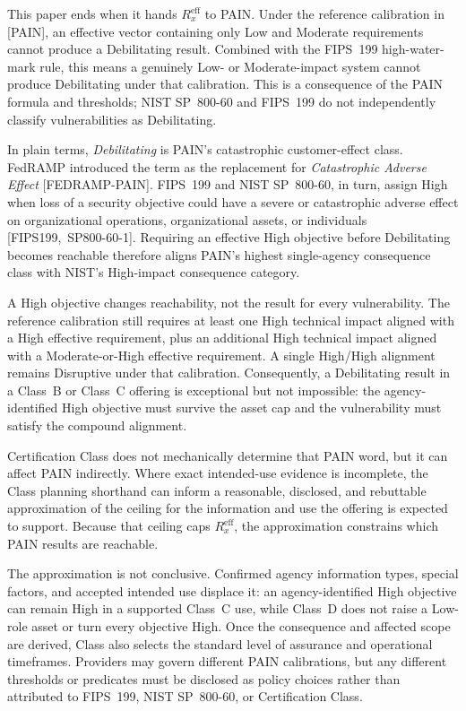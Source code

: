 \documentclass[11pt]{article}
\begin{document}
This paper ends when it hands $R_x^{\mathrm{eff}}$ to PAIN. Under the reference
calibration in \mbox{[PAIN]}, an effective vector containing only Low and Moderate
requirements cannot produce a Debilitating result. Combined with the FIPS~199
high-water-mark rule, this means a genuinely Low- or Moderate-impact system cannot
produce Debilitating under that calibration. This is a consequence of the PAIN
formula and thresholds; NIST SP~800-60 and FIPS~199 do not independently classify
vulnerabilities as Debilitating.

\begin{plain}
In plain terms, \emph{Debilitating} is PAIN's catastrophic customer-effect class.
FedRAMP introduced the term as the replacement for \emph{Catastrophic Adverse
Effect} \mbox{[FEDRAMP-PAIN]}. FIPS~199 and NIST SP~800-60, in turn, assign High
when loss of a security objective could have a severe or catastrophic adverse
effect on organizational operations, organizational assets, or individuals
\mbox{[FIPS199, SP800-60-1]}. Requiring an effective High objective before
Debilitating becomes reachable therefore aligns PAIN's highest single-agency
consequence class with NIST's High-impact consequence category.
\end{plain}

A High objective changes reachability, not the result for every vulnerability.
The reference calibration still requires at least one High technical impact aligned
with a High effective requirement, plus an additional High technical impact aligned
with a Moderate-or-High effective requirement. A single High/High alignment remains
Disruptive under that calibration. Consequently, a Debilitating result in a
Class~B or Class~C offering is exceptional but not impossible: the agency-identified
High objective must survive the asset cap and the vulnerability must satisfy the
compound alignment.

Certification Class does not mechanically determine that PAIN word, but it can
affect PAIN indirectly. Where exact intended-use evidence is incomplete, the Class
planning shorthand can inform a reasonable, disclosed, and rebuttable approximation
of the ceiling for the information and use the offering is expected to support.
Because that ceiling caps $R_x^{\mathrm{eff}}$, the approximation constrains which
PAIN results are reachable.

The approximation is not conclusive. Confirmed agency information types, special
factors, and accepted intended use displace it: an agency-identified High objective
can remain High in a supported Class~C use, while Class~D does not raise a Low-role
asset or turn every objective High. Once the consequence and affected scope are
derived, Class also selects the standard level of assurance and operational
timeframes. Providers may govern different PAIN calibrations, but any different
thresholds or predicates must be disclosed as policy choices rather than attributed
to FIPS~199, NIST SP~800-60, or Certification Class.
\end{document}

